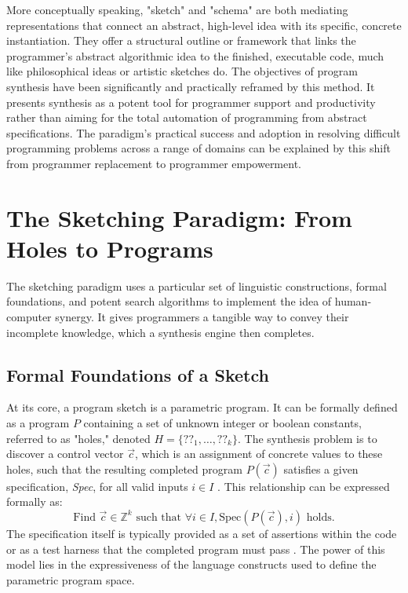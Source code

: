 \documentclass[12pt, a4paper]{report}
\begin{document}
More conceptually speaking, "sketch" and "schema" are both mediating representations that connect an abstract, high-level idea with its specific, concrete instantiation. They offer a structural outline or framework that links the programmer's abstract algorithmic idea to the finished, executable code, much like philosophical ideas or artistic sketches do. The objectives of program synthesis have been significantly and practically reframed by this method. It presents synthesis as a potent tool for programmer support and productivity rather than aiming for the total automation of programming from abstract specifications. The paradigm's practical success and adoption in resolving difficult programming problems across a range of domains can be explained by this shift from programmer replacement to programmer empowerment.

\section{The Sketching Paradigm: From Holes to Programs}

The sketching paradigm uses a particular set of linguistic constructions, formal foundations, and potent search algorithms to implement the idea of human-computer synergy. It gives programmers a tangible way to convey their incomplete knowledge, which a synthesis engine then completes.

\subsection{Formal Foundations of a Sketch}
At its core, a program sketch is a parametric program. It can be formally defined as a program $P$ containing a set of unknown integer or boolean constants, referred to as "holes," denoted $H = \{??_1, \dots, ??_k\}$. The synthesis problem is to discover a control vector $\vec{c}$, which is an assignment of concrete values to these holes, such that the resulting completed program $P(\vec{c})$ satisfies a given specification, \textit{Spec}, for all valid inputs $i \in I$ \citep{solar2008program}. This relationship can be expressed formally as:
$$ \text{Find } \vec{c} \in \mathbb{Z}^k \text{ such that } \forall i \in I, \text{Spec}(P(\vec{c}), i) \text{ holds.} $$
The specification itself is typically provided as a set of assertions within the code or as a test harness that the completed program must pass \citep{solar2008program}. The power of this model lies in the expressiveness of the language constructs used to define the parametric program space.
\end{document}

